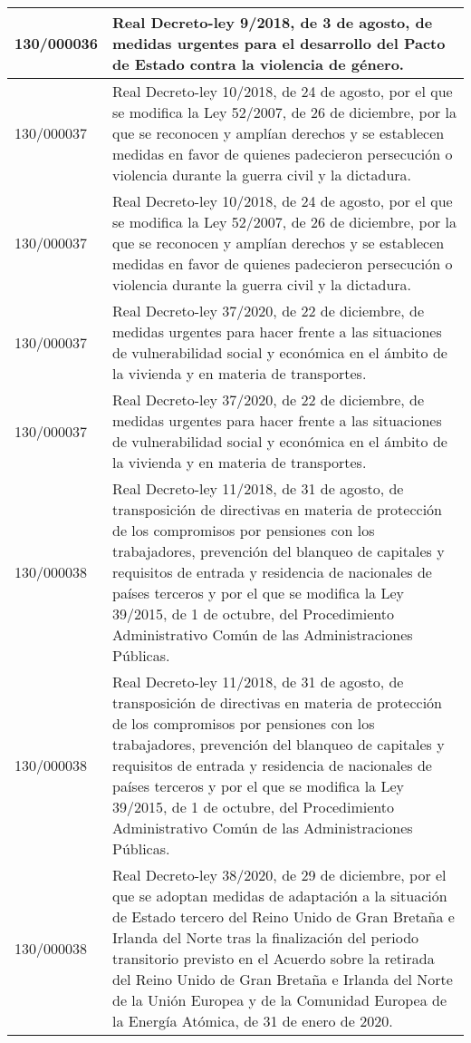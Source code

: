 {\begin{table}[H]
\begin{center}
\begin{tabularx}{\linewidth}{| l | X |}
\hline
130/000036 & Real Decreto-ley 9/2018, de 3 de agosto, de medidas urgentes para el desarrollo del Pacto de Estado contra la violencia de género. \\
\hline
130/000037 & Real Decreto-ley 10/2018, de 24 de agosto, por el que se modifica la Ley 52/2007, de 26 de diciembre, por la que se reconocen y amplían derechos y se establecen medidas en favor de quienes padecieron persecución o violencia durante la guerra civil y la dictadura. \\
\hline
130/000037 & Real Decreto-ley 10/2018, de 24 de agosto, por el que se modifica la Ley 52/2007, de 26 de diciembre, por la que se reconocen y amplían derechos y se establecen medidas en favor de quienes padecieron persecución o violencia durante la guerra civil y la dictadura. \\
\hline
130/000037 & Real Decreto-ley 37/2020, de 22 de diciembre, de medidas urgentes para hacer frente a las situaciones de vulnerabilidad social y económica en el ámbito de la vivienda y en materia de transportes. \\
\hline
130/000037 & Real Decreto-ley 37/2020, de 22 de diciembre, de medidas urgentes para hacer frente a las situaciones de vulnerabilidad social y económica en el ámbito de la vivienda y en materia de transportes. \\
\hline
130/000038 & Real Decreto-ley 11/2018, de 31 de agosto, de transposición de directivas en materia de protección de los compromisos por pensiones con los trabajadores, prevención del blanqueo de capitales y requisitos de entrada y residencia de nacionales de países terceros y por el que se modifica la Ley 39/2015, de 1 de octubre, del Procedimiento Administrativo Común de las Administraciones Públicas. \\
\hline
130/000038 & Real Decreto-ley 11/2018, de 31 de agosto, de transposición de directivas en materia de protección de los compromisos por pensiones con los trabajadores, prevención del blanqueo de capitales y requisitos de entrada y residencia de nacionales de países terceros y por el que se modifica la Ley 39/2015, de 1 de octubre, del Procedimiento Administrativo Común de las Administraciones Públicas. \\
\hline
130/000038 & Real Decreto-ley 38/2020, de 29 de diciembre, por el que se adoptan medidas de adaptación a la situación de Estado tercero del Reino Unido de Gran Bretaña e Irlanda del Norte tras la finalización del periodo transitorio previsto en el Acuerdo sobre la retirada del Reino Unido de Gran Bretaña e Irlanda del Norte de la Unión Europea y de la Comunidad Europea de la Energía Atómica, de 31 de enero de 2020. \\

\end{tabularx}
\end{center}
\end{table}}
